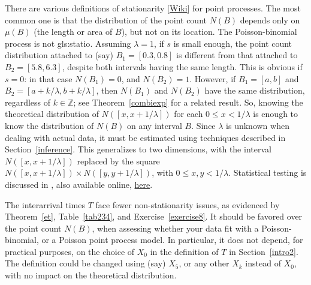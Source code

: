 \documentclass[10pt]{article}
\begin{document}
There are various definitions of \textcolor{index}{stationarity} [\href{https://mathworld.wolfram.com/StationaryPointProcess.html}{Wiki}] for point processes.  The most common one is that the distribution of the point count $N(B)$ depends only on $\mu(B)$ (the length or area of $B$), but not on its location. The Poisson-binomial process is not \gls{gls:statio}. Assuming $\lambda=1$, if $s$ is small enough, the point count distribution attached to (say) $B_1=[0.3, 0.8]$ is different from that attached to $B_2=[5.8, 6.3]$, despite both intervals having the same length. This is obvious if $s=0$: in that case $N(B_1)=0$, and $N(B_2)=1$.  However, if $B_1=[a, b]$ and
$B_2=[a+k/\lambda,b+k/\lambda]$, then $N(B_1)$ and $N(B_2)$ have the same distribution, regardless of $k\in\mathbb{Z}$; see Theorem~\ref{combiexp} for a related result. So, knowing the theoretical distribution of $N([x,x+1/\lambda])$ for each $0\leq x<1/\lambda$
is enough to know the distribution of $N(B)$ on any interval $B$. Since $\lambda$ is unknown when dealing with actual data, it must be estimated using techniques described in Section~\ref{inference}. This generalizes to two dimensions, with the interval $N([x,x+1/\lambda])$ replaced by the square $N([x,x+1/\lambda]) \times N([y,y+1/\lambda])$, with $0\leq x,y<1/\lambda$. Statistical testing is discussed in \cite{sss}, also available online, \href{http://eio.usc.es/pub/metma/descargas/comas-mateu-calduch-metmav.pdf}{here}.

The interarrival times $T$ face fewer non-stationarity issues, as evidenced by Theorem~\ref{et}, Table~\ref{tab234}, and Exercise~\ref{exercise8}. It should be favored over the point count $N(B)$, when assessing whether your data fit with a Poisson-binomial, or a Poisson point process model. In particular, it does not depend, for practical purposes, on the choice of $X_0$ in the definition of $T$ in Section~\ref{intro2}. The definition could be changed using (say) $X_5$, or any other $X_k$ instead of $X_0$, with no impact on the theoretical distribution.
\end{document}
